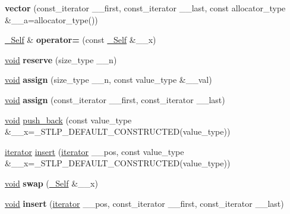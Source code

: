 \begin{DoxyCompactItemize}
{\bfseries vector} (const\+\_\+iterator \+\_\+\+\_\+first, const\+\_\+iterator \+\_\+\+\_\+last, const allocator\+\_\+type \&\+\_\+\+\_\+a=allocator\+\_\+type())
\item 
\mbox{\label{structvector_a2bc4102127c1bc24a6409ad432531b0d}} 
\hyperlink{structvector}{\+\_\+\+Self} \& {\bfseries operator=} (const \hyperlink{structvector}{\+\_\+\+Self} \&\+\_\+\+\_\+x)
\item 
\mbox{\label{structvector_af445f9328f157a6e293158b9a74b32b7}} 
\hyperlink{interfacevoid}{void} {\bfseries reserve} (size\+\_\+type \+\_\+\+\_\+n)
\item 
\mbox{\label{structvector_afa7c624241be59c6a1be5ef266841256}} 
\hyperlink{interfacevoid}{void} {\bfseries assign} (size\+\_\+type \+\_\+\+\_\+n, const value\+\_\+type \&\+\_\+\+\_\+val)
\item 
\mbox{\label{structvector_a2147001ab9ed400b65b138dbdb35e27b}} 
\hyperlink{interfacevoid}{void} {\bfseries assign} (const\+\_\+iterator \+\_\+\+\_\+first, const\+\_\+iterator \+\_\+\+\_\+last)
\item 
\hyperlink{interfacevoid}{void} \hyperlink{structvector_a74248d6152706c9f6857f9a1ffd5c937}{push\+\_\+back} (const value\+\_\+type \&\+\_\+\+\_\+x=\+\_\+\+S\+T\+L\+P\+\_\+\+D\+E\+F\+A\+U\+L\+T\+\_\+\+C\+O\+N\+S\+T\+R\+U\+C\+T\+ED(value\+\_\+type))
\item 
\hyperlink{structiterator}{iterator} \hyperlink{structvector_a8835d813f0a67b599e79b3fc592f6e3f}{insert} (\hyperlink{structiterator}{iterator} \+\_\+\+\_\+pos, const value\+\_\+type \&\+\_\+\+\_\+x=\+\_\+\+S\+T\+L\+P\+\_\+\+D\+E\+F\+A\+U\+L\+T\+\_\+\+C\+O\+N\+S\+T\+R\+U\+C\+T\+ED(value\+\_\+type))
\item 
\mbox{\label{structvector_a954adb8b00a9f3c34e29db09b9b8b582}} 
\hyperlink{interfacevoid}{void} {\bfseries swap} (\hyperlink{structvector}{\+\_\+\+Self} \&\+\_\+\+\_\+x)
\item 
\mbox{\label{structvector_a25a4b9f8039c412c282a6ac6174c7b01}} 
\hyperlink{interfacevoid}{void} {\bfseries insert} (\hyperlink{structiterator}{iterator} \+\_\+\+\_\+pos, const\+\_\+iterator \+\_\+\+\_\+first, const\+\_\+iterator \+\_\+\+\_\+last)
\item 

\end{DoxyCompactItemize}
